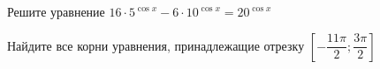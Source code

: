 \begin{ex}
	\begin{condition}
		\begin{enumcols}[label=\asbuk*)]
			\item Решите уравнение \( 16\cdot5^{\cos x} - 6\cdot10^{\cos x} = 20^{\cos x} \)
			\item Найдите все корни уравнения, принадлежащие отрезку \( \left[-\dfrac{11\pi}{2};\dfrac{3\pi}{2}\right] \)
		\end{enumcols}
	\end{condition}
\end{ex}